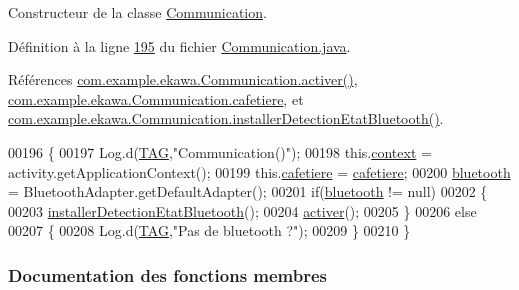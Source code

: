 Constructeur de la classe \hyperlink{classcom_1_1example_1_1ekawa_1_1_communication}{Communication}. 



Définition à la ligne \hyperlink{_communication_8java_source_l00195}{195} du fichier \hyperlink{_communication_8java_source}{Communication.\+java}.



Références \hyperlink{_communication_8java_source_l00215}{com.\+example.\+ekawa.\+Communication.\+activer()}, \hyperlink{_communication_8java_source_l00047}{com.\+example.\+ekawa.\+Communication.\+cafetiere}, et \hyperlink{_communication_8java_source_l00339}{com.\+example.\+ekawa.\+Communication.\+installer\+Detection\+Etat\+Bluetooth()}.


\begin{DoxyCode}
00196     \{
00197         Log.d(\hyperlink{classcom_1_1example_1_1ekawa_1_1_communication_af355bac38153a4e6d1cda0b3e74bc1c7}{TAG},\textcolor{stringliteral}{"Communication()"});
00198         this.\hyperlink{classcom_1_1example_1_1ekawa_1_1_communication_aa5ae3c4eaab6ec31d3b358431e812d00}{context} = activity.getApplicationContext();
00199         this.\hyperlink{classcom_1_1example_1_1ekawa_1_1_communication_a3b69b78cdf60bc35b2e3e564519dc1b6}{cafetiere} = \hyperlink{classcom_1_1example_1_1ekawa_1_1_communication_a3b69b78cdf60bc35b2e3e564519dc1b6}{cafetiere};
00200         \hyperlink{classcom_1_1example_1_1ekawa_1_1_communication_a0ed43f74b2eae7e8f150b049953da384}{bluetooth} = BluetoothAdapter.getDefaultAdapter();
00201         \textcolor{keywordflow}{if}(\hyperlink{classcom_1_1example_1_1ekawa_1_1_communication_a0ed43f74b2eae7e8f150b049953da384}{bluetooth} != null)
00202         \{
00203             \hyperlink{classcom_1_1example_1_1ekawa_1_1_communication_a6640c878b7a4c97af7ccda45e33ead80}{installerDetectionEtatBluetooth}();
00204             \hyperlink{classcom_1_1example_1_1ekawa_1_1_communication_a64e0731414722f27a990d8ac884aca83}{activer}();
00205         \}
00206         \textcolor{keywordflow}{else}
00207         \{
00208             Log.d(\hyperlink{classcom_1_1example_1_1ekawa_1_1_communication_af355bac38153a4e6d1cda0b3e74bc1c7}{TAG},\textcolor{stringliteral}{"Pas de bluetooth ?"});
00209         \}
00210     \}
\end{DoxyCode}


\subsubsection{Documentation des fonctions membres}
\mbox{\label{classcom_1_1example_1_1ekawa_1_1_communication_a64e0731414722f27a990d8ac884aca83}} 
